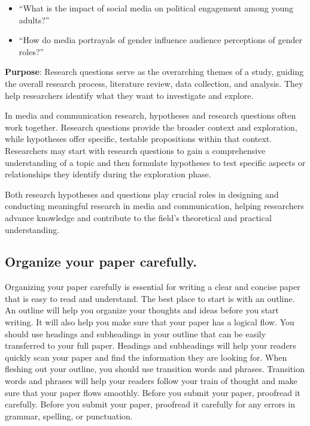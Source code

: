 \documentclass[
]{book}
\begin{document}
\begin{itemize}
\item
  ``What is the impact of social media on political engagement among young adults?''
\item
  ``How do media portrayals of gender influence audience perceptions of gender roles?''
\end{itemize}

\textbf{Purpose}: Research questions serve as the overarching themes of a study, guiding the overall research process, literature review, data collection, and analysis. They help researchers identify what they want to investigate and explore.

In media and communication research, hypotheses and research questions often work together. Research questions provide the broader context and exploration, while hypotheses offer specific, testable propositions within that context. Researchers may start with research questions to gain a comprehensive understanding of a topic and then formulate hypotheses to test specific aspects or relationships they identify during the exploration phase.

Both research hypotheses and questions play crucial roles in designing and conducting meaningful research in media and communication, helping researchers advance knowledge and contribute to the field's theoretical and practical understanding.

\hypertarget{organize-your-paper-carefully.}{%
\subsection*{Organize your paper carefully.}\label{organize-your-paper-carefully.}}

Organizing your paper carefully is essential for writing a clear and concise paper that is easy to read and understand. The best place to start is with an outline. An outline will help you organize your thoughts and ideas before you start writing. It will also help you make sure that your paper has a logical flow. You should use headings and subheadings in your outline that can be easily transferred to your full paper. Headings and subheadings will help your readers quickly scan your paper and find the information they are looking for. When fleshing out your outline, you should use transition words and phrases. Transition words and phrases will help your readers follow your train of thought and make sure that your paper flows smoothly. Before you submit your paper, proofread it carefully. Before you submit your paper, proofread it carefully for any errors in grammar, spelling, or punctuation.
\end{document}
